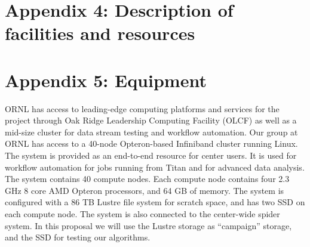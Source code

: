 \documentclass[11pt,titlepage]{report}
\begin{document}
{\section*{Appendix 4: Description of facilities and resources}


\clearpage
\markboth{}{}
{}
\section*{Appendix 5: Equipment}

\vspace{2ex}
\noindent
ORNL has access to leading-edge computing platforms and services for the project through Oak Ridge Leadership Computing Facility (OLCF) as well as a mid-size cluster for data stream testing and workflow automation.
Our group at ORNL has access to a 40-node Opteron-based Infiniband cluster running Linux. The system is provided as an end-to-end resource for center users. It is used for workflow automation for jobs running from Titan and for advanced data analysis. The system contains 40 compute nodes. Each compute node contains four 2.3 GHz 8 core AMD Opteron processors, and 64 GB of memory. The system is configured with a 86 TB Lustre file system for scratch space, and has two SSD on each compute node.
The system is also connected to the center-wide spider system. In this proposal we will use the Lustre storage as ``campaign''
storage, and the SSD for testing our algorithms.

\clearpage
\markboth{}{}




%
%
%
%
%
%
%
%
%
%
%
%
%
%
%
%
%   

}
\end{document}
